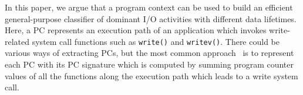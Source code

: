In this paper, we argue that a program context can be
used to build an efficient general-purpose 
classifier of dominant I/O activities with different data lifetimes.
Here, a PC
represents an execution path of an application which invokes write-related
system call functions such as {\tt write()} and {\tt writev()}.  
There could be various ways of extracting PCs, 
but the most common approach~\cite{PC, PC2} is to
represent each PC with its PC signature which is computed by summing 
program counter values of all the functions along the execution path which
leads to a write system call.


\begin{figure}[!t]
\centering
	\hspace{10pt}
	\hspace{10pt}

	\hfill


\end{figure}
